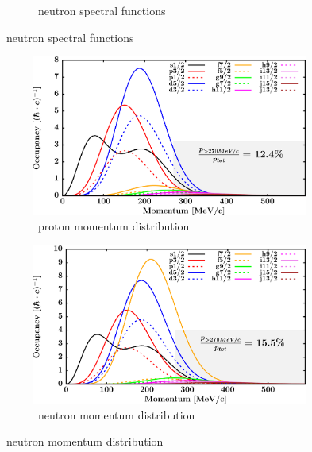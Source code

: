 \begin{figure}[hbtp]
\begin{subfigure}[b]{0.45\textwidth}
        \caption{\caEight\ neutron spectral functions}
        \label{DOMFitData_ca48_neutron_spectralFunctions}
    \end{subfigure}
\end{figure}
\afterpage{\clearpage}
\begin{figure}[hbtp]
    \captionsetup[subfigure]{labelformat=empty}
    \centering
    \begin{subfigure}[b]{0.45\textwidth}
        \centering
        \includegraphics[width=\linewidth]{figures/ca48_protonLJMomentumDistIntegral.png}
        \caption{\caEight\ proton momentum distribution}
        \label{DOMFitData_ca48_proton_momentumDist}
    \end{subfigure}\hspace{6pt}
    \begin{subfigure}[b]{0.45\textwidth}
        \centering
        \includegraphics[width=\linewidth]{figures/ca48_neutronLJMomentumDistIntegral.png}
        \caption{\caEight\ neutron momentum distribution}
        \label{DOMFitData_ca48_neutron_momentumDist}
    \end{subfigure}\vspace{0.3in}

\end{figure}
